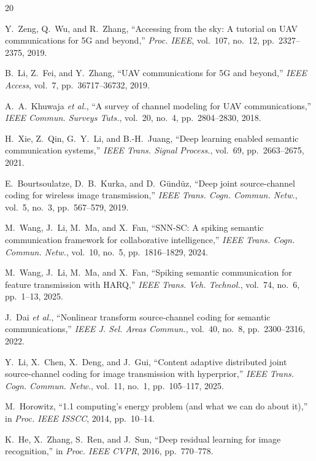 \documentclass[conference]{IEEEtran}
\begin{document}
\begin{thebibliography}{20}

Y.~Zeng, Q.~Wu, and R.~Zhang, ``Accessing from the sky: A tutorial on UAV communications for 5G and beyond,'' \emph{Proc. IEEE}, vol.~107, no.~12, pp.~2327--2375, 2019.

B.~Li, Z.~Fei, and Y.~Zhang, ``UAV communications for 5G and beyond,'' \emph{IEEE Access}, vol.~7, pp.~36717--36732, 2019.

A.~A.~Khuwaja \emph{et al.}, ``A survey of channel modeling for UAV communications,'' \emph{IEEE Commun. Surveys Tuts.}, vol.~20, no.~4, pp.~2804--2830, 2018.

H.~Xie, Z.~Qin, G.~Y.~Li, and B.-H.~Juang, ``Deep learning enabled semantic communication systems,'' \emph{IEEE Trans. Signal Process.}, vol.~69, pp.~2663--2675, 2021.

E.~Bourtsoulatze, D.~B.~Kurka, and D.~G\"{u}nd\"{u}z, ``Deep joint source-channel coding for wireless image transmission,'' \emph{IEEE Trans. Cogn. Commun. Netw.}, vol.~5, no.~3, pp.~567--579, 2019.

M.~Wang, J.~Li, M.~Ma, and X.~Fan, ``SNN-SC: A spiking semantic communication framework for collaborative intelligence,'' \emph{IEEE Trans. Cogn. Commun. Netw.}, vol.~10, no.~5, pp.~1816--1829, 2024.

M.~Wang, J.~Li, M.~Ma, and X.~Fan, ``Spiking semantic communication for feature transmission with HARQ,'' \emph{IEEE Trans. Veh. Technol.}, vol.~74, no.~6, pp.~1--13, 2025.

J.~Dai \emph{et al.}, ``Nonlinear transform source-channel coding for semantic communications,'' \emph{IEEE J. Sel. Areas Commun.}, vol.~40, no.~8, pp.~2300--2316, 2022.

Y.~Li, X.~Chen, X.~Deng, and J.~Gui, ``Content adaptive distributed joint source-channel coding for image transmission with hyperprior,'' \emph{IEEE Trans. Cogn. Commun. Netw.}, vol.~11, no.~1, pp.~105--117, 2025.

M.~Horowitz, ``1.1 computing's energy problem (and what we can do about it),'' in \emph{Proc. IEEE ISSCC}, 2014, pp.~10--14.

K.~He, X.~Zhang, S.~Ren, and J.~Sun, ``Deep residual learning for image recognition,'' in \emph{Proc. IEEE CVPR}, 2016, pp.~770--778.


\end{thebibliography}
\end{document}
